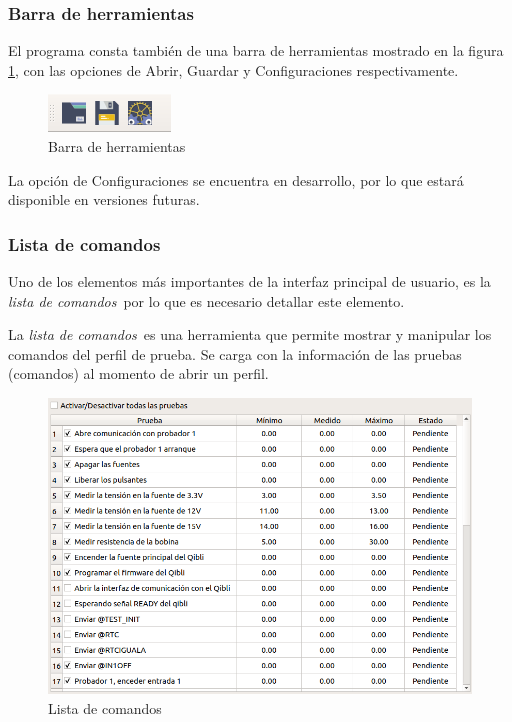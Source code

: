\documentclass[a4paper,12pt]{refart}
\newcommand\commandList{\textit{lista de comandos}}
\begin{document}
\subsubsection{Barra de herramientas}
El programa consta también de una barra de herramientas mostrado en la figura \ref{fig:toolbar}, con las opciones de Abrir, Guardar y Configuraciones respectivamente.

\begin{figure}[hbt!]\centering
\includegraphics[scale=1]{images/toolbar} 
\caption{Barra de herramientas}
\label{fig:toolbar}
\end{figure}

\begin{leftbar}
La opción de Configuraciones se encuentra en desarrollo, por lo que estará disponible en versiones futuras.
\end{leftbar}

\subsubsection{Lista de comandos} \label{ref:commandList}
Uno de los elementos más importantes de la interfaz principal de usuario, es la \commandList\, por lo que es necesario detallar este elemento.

La \commandList\ es una herramienta que permite mostrar y manipular los comandos del perfil de prueba. Se carga con la información de las pruebas (comandos) al momento de abrir un perfil.

\begin{figure}[hbt!]\centering
\includegraphics[width=\textwidth, frame]{images/main_commandList}
\caption{Lista de comandos}
\label{fig:commandList}
\end{figure}
\end{document}

